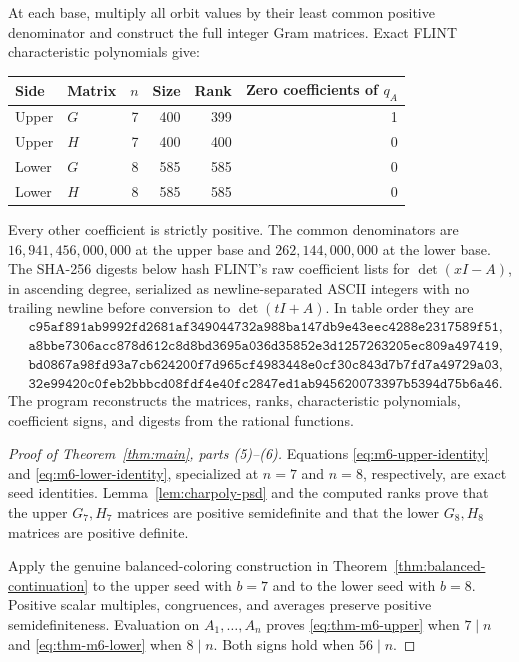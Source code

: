 \documentclass[11pt]{article}
\begin{document}
At each base, multiply all orbit values by their least common positive
denominator and construct the full integer Gram matrices.  Exact FLINT
characteristic polynomials give:
\begin{center}
\begin{tabular}{llrrrr}
\toprule
Side & Matrix & \(n\) & Size & Rank & Zero coefficients of \(q_A\)\\
\midrule
Upper & \(G\) & 7 & 400 & 399 & 1\\
Upper & \(H\) & 7 & 400 & 400 & 0\\
Lower & \(G\) & 8 & 585 & 585 & 0\\
Lower & \(H\) & 8 & 585 & 585 & 0\\
\bottomrule
\end{tabular}
\end{center}
Every other coefficient is strictly positive.  The common denominators are
\(16{,}941{,}456{,}000{,}000\) at the upper base and
\(262{,}144{,}000{,}000\) at the lower base.  The SHA-256 digests below hash
FLINT's raw coefficient lists for \(\det(xI-A)\), in ascending degree,
serialized as newline-separated ASCII integers with no trailing newline
before conversion to
\(\det(tI+A)\).  In table order they are
\begin{align*}
&\texttt{c95af891ab9992fd2681af349044732a988ba147db9e43eec4288e2317589f51},\\
&\texttt{a8bbe7306acc878d612c8d8bd3695a036d35852e3d1257263205ec809a497419},\\
&\texttt{bd0867a98fd93a7cb624200f7d965cf4983448e0cf30c843d7b7fd7a49729a03},\\
&\texttt{32e99420c0feb2bbbcd08fdf4e40fc2847ed1ab945620073397b5394d75b6a46}.
\end{align*}
The program
reconstructs the matrices, ranks, characteristic polynomials, coefficient
signs, and digests from the rational functions.

\begin{proof}[Proof of Theorem~\ref{thm:main}, parts (5)--(6)]
Equations \eqref{eq:m6-upper-identity} and
\eqref{eq:m6-lower-identity}, specialized at \(n=7\) and \(n=8\),
respectively, are exact seed identities.  Lemma~\ref{lem:charpoly-psd} and the
computed ranks prove that the upper \(G_7,H_7\) matrices are positive
semidefinite and that the lower \(G_8,H_8\) matrices are positive definite.

Apply the genuine balanced-coloring construction in
Theorem~\ref{thm:balanced-continuation} to the upper seed with \(b=7\) and to
the lower seed with \(b=8\).  Positive scalar multiples, congruences, and
averages preserve positive semidefiniteness.  Evaluation on
\(A_1,\ldots,A_n\) proves \eqref{eq:thm-m6-upper} when \(7\mid n\) and
\eqref{eq:thm-m6-lower} when \(8\mid n\).  Both signs hold when
\(56\mid n\).
\end{proof}
\end{document}
